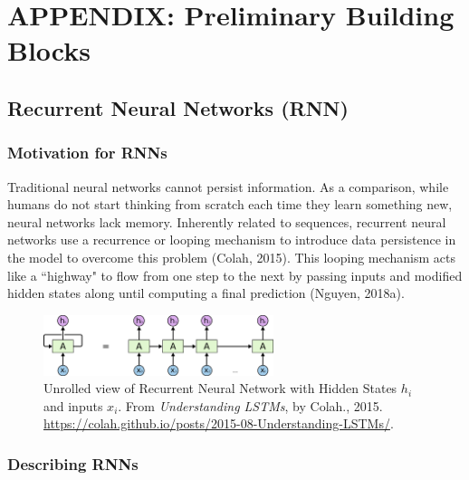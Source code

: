 \section{APPENDIX: Preliminary Building Blocks} \label{Appendix_BasicsRNNLSTM}

\subsection{Recurrent Neural Networks (RNN)}

\subsubsection{Motivation for RNNs}

Traditional neural networks cannot persist information. As a comparison, while humans do not start thinking from scratch each time they learn something new, neural networks lack memory. Inherently related to sequences, recurrent neural networks use a recurrence or looping mechanism to introduce data persistence in the model to overcome this problem (Colah, 2015). This looping mechanism acts like a ``highway" to flow from one step to the next by passing inputs and modified hidden states along until computing a final prediction (Nguyen, 2018a). 

\begin{figure}[h]
\vspace{-5pt}
\centering
\includegraphics[width=0.6\textwidth]{imgs/rnn_colah_unrolled.png}
\vspace{-5pt}
\caption{\footnotesize Unrolled view of Recurrent Neural Network with Hidden States $h_i$ and inputs $x_i$. From \emph{Understanding LSTMs}, by Colah., 2015. \url{https://colah.github.io/posts/2015-08-Understanding-LSTMs/}. }
\vspace{-5pt}
\end{figure}


\subsubsection{Describing RNNs}

